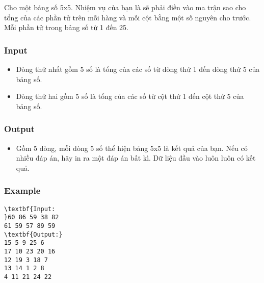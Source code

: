 

Cho một bảng số 5x5. Nhiệm vụ của bạn là sẽ phải điền vào ma trận sao cho tổng của các phần tử trên mỗi hàng và mỗi cột bằng một số nguyên cho trước. Mỗi phần tử trong bảng số từ 1 đến 25.

\subsubsection{Input}
\begin{itemize}
	\item Dòng thứ nhất gồm 5 số là tổng của các số từ dòng thứ 1 đến dòng thứ 5 của bảng số.
	\item Dòng thứ hai gồm 5 số là tổng của các số từ cột thứ 1 đến cột thứ 5 của bảng số.
\end{itemize}

\subsubsection{Output}
\begin{itemize}
	\item Gồm 5 dòng, mỗi dòng 5 số thể hiện bảng 5x5 là kết quả của bạn. Nếu có nhiều đáp án, hãy in ra một đáp án bất kì. Dữ liệu đầu vào luôn luôn có kết quả.
\end{itemize}

\subsubsection{Example}
\begin{verbatim}
\textbf{Input:
}60 86 59 38 82 
61 59 57 89 59
\textbf{Output:}
15 5 9 25 6 
17 10 23 20 16 
12 19 3 18 7 
13 14 1 2 8 
4 11 21 24 22 
\end{verbatim}